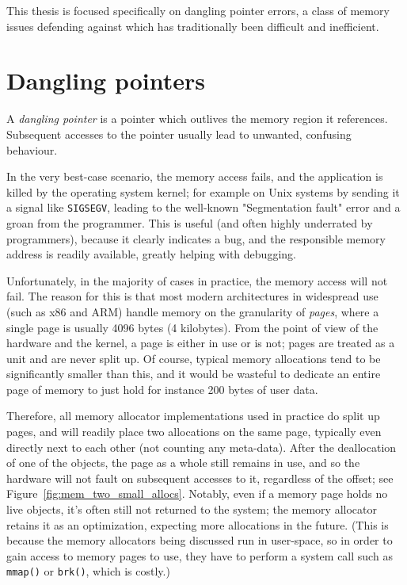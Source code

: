 This thesis is focused specifically on dangling pointer errors, a class of memory issues defending against which has traditionally been difficult and inefficient.

\section{Dangling pointers}

A \emph{dangling pointer} is a pointer which outlives the memory region it references. Subsequent accesses to the pointer usually lead to unwanted, confusing behaviour.

In the very best-case scenario, the memory access fails, and the application is killed by the operating system kernel; for example on Unix systems by sending it a signal like \lstinline!SIGSEGV!, leading to the well-known "Segmentation fault" error and a groan from the programmer. This is useful (and often highly underrated by programmers), because it clearly indicates a bug, and the responsible memory address is readily available, greatly helping with debugging.

Unfortunately, in the majority of cases in practice, the memory access will not fail. The reason for this is that most modern architectures in widespread use (such as x86 and ARM) handle memory on the granularity of \emph{pages}, where a single page is usually 4096 bytes (4 kilobytes). From the point of view of the hardware and the kernel, a page is either in use or is not; pages are treated as a unit and are never split up. Of course, typical memory allocations tend to be significantly smaller than this, and it would be wasteful to dedicate an entire page of memory to just hold for instance 200 bytes of user data.

Therefore, all memory allocator implementations used in practice do split up pages, and will readily place two allocations on the same page, typically even directly next to each other (not counting any meta-data). After the deallocation of one of the objects, the page as a whole still remains in use, and so the hardware will not fault on subsequent accesses to it, regardless of the offset; see Figure~\ref{fig:mem_two_small_allocs}. Notably, even if a memory page holds no live objects, it's often still not returned to the system; the memory allocator retains it as an optimization, expecting more allocations in the future. (This is because the memory allocators being discussed run in user-space, so in order to gain access to memory pages to use, they have to perform a system call such as \lstinline|mmap()| or \lstinline|brk()|, which is costly.)

